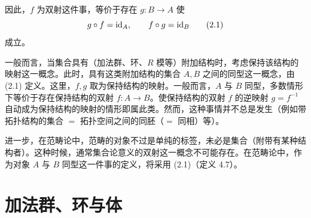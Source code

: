 
因此，$f$ 为双射这件事，等价于存在 $g\colon B\to A$ 使
\begin{equation}
  g\circ f = \mathrm{id}_A,\qquad f\circ g = \mathrm{id}_B \tag{2.1}
\end{equation}
成立。


一般而言，当集合具有（加法群、环、$R$ 模等）附加结构时，考虑保持该结构的映射这一概念。此时，具有这类附加结构的集合 $A,B$ 之间的同型这一概念，由 (2.1) 定义。这里，$f,g$ 取为保持结构的映射。一般而言，$A$ 与 $B$ 同型，多数情形下等价于存在保持结构的双射 $f\colon A\to B$。使保持结构的双射 $f$ 的逆映射 $g=f^{-1}$ 自动成为保持结构的映射的情形即属此类。然而，这种事情并不总是发生（例如带拓扑结构的集合 $=$ 拓扑空间之间的同胚（$=$ 同相）等）。



进一步，在范畴论中，范畴的对象不过是单纯的标签，未必是集合（附带有某种结构者）。这种时候，通常集合论意义的双射这一概念不可能存在。在范畴论中，作为对象 $A$ 与 $B$ 同型这一件事的定义，将采用 (2.1)（定义 4.7）。

\section{加法群、环与体}
